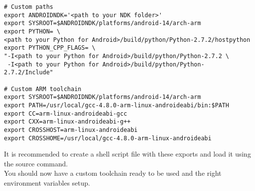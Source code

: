 	\begin{lstlisting}
# Custom paths
export ANDROIDNDK='<path to your NDK folder>'
export SYSROOT=$ANDROIDNDK/platforms/android-14/arch-arm
export PYTHON= \ 
<path to your Python for Android>/build/python/Python-2.7.2/hostpython
export PYTHON_CPP_FLAGS= \
"-I<path to your Python for Android>/build/python/Python-2.7.2 \
 -I<path to your Python for Android>/build/python/Python-2.7.2/Include"
	 
# Custom ARM toolchain
export SYSROOT=$ANDROIDNDK/platforms/android-14/arch-arm
export PATH=/usr/local/gcc-4.8.0-arm-linux-androideabi/bin:$PATH
export CC=arm-linux-androideabi-gcc
export CXX=arm-linux-androideabi-g++
export CROSSHOST=arm-linux-androideabi
export CROSSHOME=/usr/local/gcc-4.8.0-arm-linux-androideabi
	\end{lstlisting}
	It is recommended to create a shell script file with these exports and load it using the source command.\\
	You should now have a custom toolchain ready to be used and the right environment variables setup.